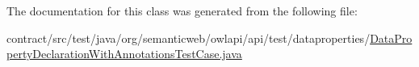 The documentation for this class was generated from the following file\-:\begin{DoxyCompactItemize}
\item 
contract/src/test/java/org/semanticweb/owlapi/api/test/dataproperties/\hyperlink{_data_property_declaration_with_annotations_test_case_8java}{Data\-Property\-Declaration\-With\-Annotations\-Test\-Case.\-java}\end{DoxyCompactItemize}
